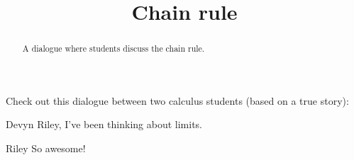 \documentclass{ximera}
\title[Break-Ground:]{Chain rule}
\begin{document}
\begin{abstract}
A dialogue where students discuss the chain rule.
\end{abstract}
\maketitle

Check out this dialogue between two calculus students (based on a true story):

\begin{dialogue}
\item[Devyn] Riley, I've been thinking about limits.
\item[Riley] So awesome!
\end{dialogue}




\end{document}
